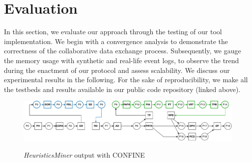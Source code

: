 \label{sec:discussion:subsec:convergence}
\section{Evaluation}
\label{sec:evaluation}

In this section, we evaluate our approach through the testing of our tool implementation. %
We begin with a convergence analysis %
to demonstrate the correctness of the collaborative data exchange process. Subsequently, we %
gauge the memory usage with synthetic and real-life event logs, to observe the trend during the enactment of our protocol and assess scalability. We discuss our experimental results in the following.
For the sake of reproducibility, we make all the testbeds and results available in our public code repository (linked above).
%
\begin{figure}[bt]
	\includegraphics[width=1\linewidth]{content/figures/mergedDep1.pdf}\label{fig:wfnet:d}
	\caption[HeuristicsMiner output]{\emph{HeuristicsMiner} output with CONFINE}
	\label{fig:wfnet}
\end{figure}    


